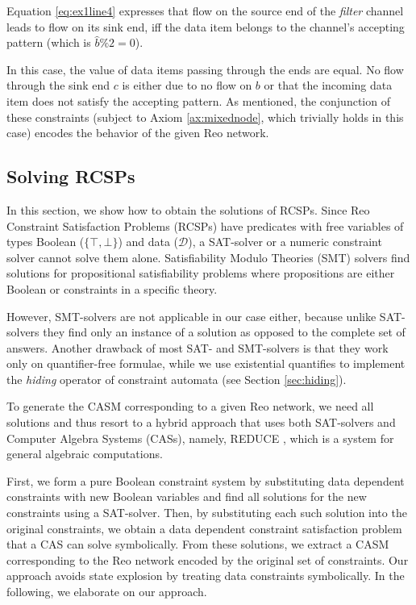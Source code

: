    Equation \ref{eq:ex1line4} expresses that flow on the source end of the \emph{filter} channel leads to flow on its sink end, iff the data item belongs to the channel's accepting pattern (which is $\hat{b}\%2=0$). 
   
   In this case, the value of data items passing through the ends are equal. No flow through the sink end $c$ is either due to no flow on $b$ or that the incoming data item does not satisfy the accepting pattern. As mentioned, the conjunction of these constraints (subject to Axiom \ref{ax:mixednode}, which trivially holds in this case) encodes the behavior of the given Reo network.

\subsection{Solving RCSPs}
In this section, we show how to obtain the solutions of RCSPs. 
Since Reo Constraint Satisfaction Problems (RCSPs) have predicates with free variables of types Boolean ($\{\top, \bot\}$) and data ($\mathcal{D}$), a SAT-solver or a numeric constraint solver cannot solve them alone. Satisfiability Modulo Theories (SMT) \cite{smt} solvers find solutions for propositional satisfiability problems where propositions are either Boolean or constraints in a specific theory. 

However, SMT-solvers are not applicable in our case either, because unlike SAT-solvers they find only an instance of a solution as opposed to the complete set of answers. Another drawback of most SAT- and SMT-solvers is that they work only on quantifier-free formulae, while we use existential quantifies to implement the \emph{hiding} operator of constraint automata (see Section \ref{sec:hiding}).

To generate the CASM corresponding to a given Reo network, we need all solutions and thus resort to a hybrid approach that uses both SAT-solvers and Computer Algebra Systems (CASs), namely, REDUCE \cite{ReduceBook}, which is a system for general algebraic computations.

First, we form a pure Boolean constraint system by substituting data dependent constraints with new Boolean variables and find all solutions for the new constraints using a SAT-solver. Then, by substituting each such solution into the original constraints, we obtain a data dependent  constraint satisfaction problem that a CAS can solve symbolically. From these solutions, we extract a CASM corresponding to the Reo network encoded by the original set of constraints. Our approach avoids state explosion by treating data constraints symbolically. In the following, we elaborate on our approach.

